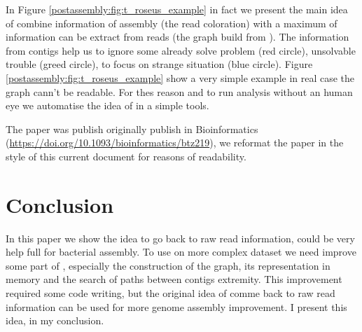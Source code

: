 \documentclass[main.tex]{subfiles}
\begin{document}
In Figure \ref{postassembly:fig:t_roseus_example} in fact we present the main idea of \knot combine information of assembly (the read coloration) with a maximum of information can be extract from reads (the \OLC graph build from \minimap). The information from contigs help us to ignore some already solve problem (red circle), unsolvable trouble (greed circle), to focus on strange situation (blue circle). Figure \ref{postassembly:fig:t_roseus_example} show a very simple example in real case the \OLC graph cann't be readable. For thes reason and to run analysis without an human eye we automatise the idea of \knot in a simple tools.

The paper was publish originally publish in Bioinformatics (\url{https://doi.org/10.1093/bioinformatics/btz219}), we reformat the paper in the style of this current document for reasons of readability.




\section{Conclusion}

In this paper we show the idea to go back to raw read information, could be very help full for bacterial assembly. To use \knot on more complex dataset we need improve some part of \knot, especially the construction of the graph, its representation in memory and the search of paths between contigs extremity. This improvement required some code writing, but the original idea of comme back to raw read information can be used for more genome assembly improvement. I present this idea, in my conclusion.


\end{document}
